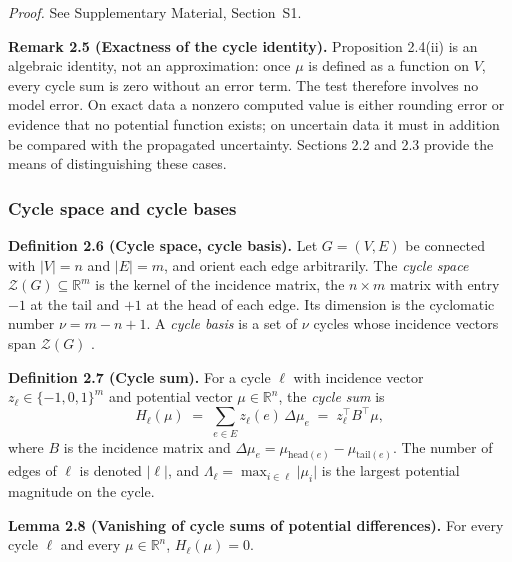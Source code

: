 \documentclass[11pt,a4paper]{article}
\theoremstyle{pstyle}
\theoremstyle{definition}
\theoremstyle{remark}
\newcommand{\R}{\mathbb{R}}
\newcommand{\abs}[1]{\lvert#1\rvert}
\newcommand{\hol}{H}
\begin{document}
\noindent\emph{Proof.} See Supplementary Material, Section~S1.

\par\noindent\textbf{Remark 2.5 (Exactness of the cycle identity).}\label{rem:exact} 
Proposition 2.4(ii) is an algebraic identity, not an
approximation: once $\mu$ is defined as a function on $V$, every cycle
sum is zero without an error term. The test therefore involves no model
error. On exact data a nonzero computed value is either rounding error
or evidence that no potential function exists; on uncertain data it
must in addition be compared with the propagated uncertainty.
Sections 2.2 and 2.3 provide the means of
distinguishing these cases.
\par

\subsubsection{Cycle space and cycle bases}

\par\noindent\textbf{Definition 2.6 (Cycle space, cycle basis).}\label{def:cyclespace} 
Let $G=(V,E)$ be connected with $\abs{V}=n$ and $\abs{E}=m$, and orient
each edge arbitrarily. The \emph{cycle space} $\mathcal{Z}(G)\subseteq
\R^{m}$ is the kernel of the incidence matrix, the $n\times m$ matrix
with entry $-1$ at the tail and $+1$ at the head of each edge. Its
dimension is the cyclomatic number $\nu = m-n+1$. A \emph{cycle basis}
is a set of $\nu$ cycles whose incidence vectors span $\mathcal{Z}(G)$
\citep{diestel2017,bollobas1998,kavitha2009}.
\par

\par\noindent\textbf{Definition 2.7 (Cycle sum).}\label{def:cyclesum} 
For a cycle $\ell$ with incidence vector $z_\ell\in\{-1,0,1\}^{m}$ and
potential vector $\mu\in\R^{n}$, the \emph{cycle sum} is
\begin{equation}
  \hol_\ell(\mu) \;=\; \sum_{e\in E} z_\ell(e)\,\Delta\mu_e
  \;=\; z_\ell^{\top} B^{\top}\mu,
  \label{eq:cyclesum}
\end{equation}
where $B$ is the incidence matrix and $\Delta\mu_e = \mu_{\mathrm{head}(e)}
- \mu_{\mathrm{tail}(e)}$. The number of edges of $\ell$ is denoted
$\abs{\ell}$, and $\Lambda_\ell = \max_{i\in\ell}\abs{\mu_i}$ is the
largest potential magnitude on the cycle.
\par

\par\noindent\textbf{Lemma 2.8 (Vanishing of cycle sums of potential differences).}\label{lem:vanish} 
For every cycle $\ell$ and every $\mu\in\R^{n}$, $\hol_\ell(\mu)=0$.
\par
\end{document}
